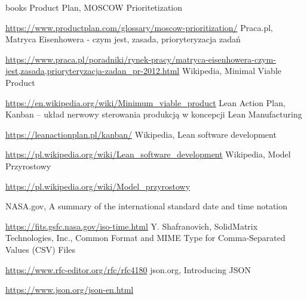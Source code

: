 \documentclass[a4paper,10pt, twoside]{report}
\begin{document}
\begin{large}
\begin{thebibliography} {books}
     Product Plan, MOSCOW Prioritetization \raggedright\url{
        https://www.productplan.com/glossary/moscow-prioritization/}
    Praca.pl, Matryca Eisenhowera - czym jest, zasada, prioryteryzacja zadań \raggedright\url{
        https://www.praca.pl/poradniki/rynek-pracy/matryca-eisenhowera-czym-jest,zasada,prioryteryzacja-zadan_pr-2012.html}
     Wikipedia, Minimal Viable Product \raggedright\url{
        https://en.wikipedia.org/wiki/Minimum_viable_product}
     Lean Action Plan, Kanban – układ nerwowy sterowania produkcją w koncepcji Lean Manufacturing \raggedright\url{
        https://leanactionplan.pl/kanban/}
     Wikipedia, Lean software development \raggedright\url{
        https://pl.wikipedia.org/wiki/Lean_software_development}
     Wikipedia, Model Przyrostowy \raggedright\url{
        https://pl.wikipedia.org/wiki/Model_przyrostowy}
    
     NASA.gov, A summary of the international standard date and time notation \raggedright\url{
        https://fits.gsfc.nasa.gov/iso-time.html}
     Y. Shafranovich, SolidMatrix Technologies, Inc., Common Format and MIME Type for Comma-Separated Values (CSV) Files \raggedright\url{
        https://www.rfc-editor.org/rfc/rfc4180}
     json.org, Introducing JSON \raggedright\url{
        https://www.json.org/json-en.html}
    

\end{thebibliography}
\end{large}
\end{document}
